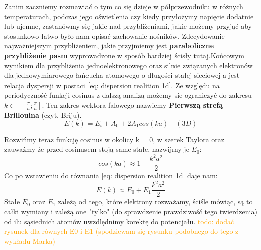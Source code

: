     \noindent Zanim zaczniemy rozmawiać o tym co się dzieje w półprzewodniku w różnych temperaturach, podczas jego oświetlenia czy kiedy przyłożymy napięcie dodatnie lub ujemne, zastanówmy się jakie 
    nad przybliżeniami, jakie możemy przyjąć aby stosunkowo łatwo było nam opisać zachowanie nośników. 
    \newline \newline
    \noindent Zdecydowanie najważniejszym przybliżeniem, jakie przyjmiemy jest \textbf{paraboliczne przybliżenie pasm} wyprowadzone w sposób 
    bardziej ścisły \hyperlink{\ref{appendix: quadratic approximation}}{tutaj}.Końcowym wynikiem dla przybliżenia jednoelektronowego oraz silnie związanych elektronów dla 
    jednowymiarowego łańcucha atomowego o długości stałej sieciowej a jest relacja dyspersji w postaci \ref{eq: dispersion realition 1d}. Ze względu na periodyczność funkcji cosinus 
    z dalszą analizą możemy sie ograniczyć do zakresu $k\in [-\frac{\pi}{a};\frac{\pi}{a}]$. Ten zakres wektora falowego nazwiemy \textbf{Pierwszą strefą Brillouina} (czyt. Briju). 
    \begin{equation}
        E(k) = E_i + A_0 + 2A_1 cos(ka) \quad (3D) \label{eq: dispersion realition 1d}
    \end{equation}
    
    \noindent Rozwińmy teraz funkcję cosinus w okolicy k = 0, w szerek Taylora oraz zauważmy że przed cosinusem stoją same stałe, nazwijmy je $E_0$:
    \begin{equation}
        cos(ka) \approx 1 - \frac{k^2a^2}{2}\nonumber
    \end{equation}    
    Co po wstawieniu do równania \ref{eq: dispersion realition 1d} daje nam:
    \begin{equation}
        E(k) \approx E_0 + E_1 \frac{k^2a^2}{2} \label{eq: quadaratic approximation}
    \end{equation}
    Stałe $E_0$ oraz $E_1$ zależą od tego, które elektrony rozważamy, ściśle mówiąc, są to całki wymiany i zależą one "tylko" (do sprawdzenie prawdziwość tego twierdzenia) od ilu sąsiednich atomów uwzdlędnimy korektę do potencjału. \newline\newline
    \noindent\textcolor{orange}{todo: dodać rysunek dla równych E0 i E1 (spodziewam się rysunku podobnego do tego z wykładu Marka)}


